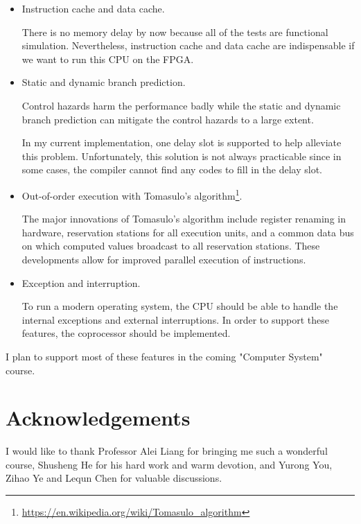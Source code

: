 \documentclass{article}
\begin{document}
\begin{itemize}
\item
Instruction cache and data cache.

There is no memory delay by now because all of the tests are functional simulation. Nevertheless, instruction cache and data cache are indispensable if we want to run this CPU on the FPGA. 
\item
Static and dynamic branch prediction.

Control hazards harm the performance badly while the static and dynamic branch prediction can mitigate the control hazards to a large extent.

In my current implementation, one delay slot is supported to help alleviate this problem. Unfortunately, this solution is not always practicable since in some cases, the compiler cannot find any codes to fill in the delay slot.
\item
Out-of-order execution with Tomasulo's algorithm\footnote{\url{https://en.wikipedia.org/wiki/Tomasulo_algorithm}}.

The major innovations of Tomasulo's algorithm include register renaming in hardware, reservation stations for all execution units, and a common data bus on which computed values broadcast to all reservation stations. These developments allow for improved parallel execution of instructions.
\item
Exception and interruption.

To run a modern operating system, the CPU should be able to handle the internal exceptions and external interruptions. In order to support these features, the coprocessor should be implemented.
\end{itemize}
I plan to support most of these features in the coming "Computer System" course.

\section{Acknowledgements}
I would like to thank Professor Alei Liang for bringing me such a wonderful course, Shusheng He for his hard work and warm devotion, and Yurong You, Zihao Ye and Lequn Chen for valuable discussions.

\newpage
\nocite{patterson2013computer, hennessy2011computer, li2011computer, palnitkar2003verilog, lei2014computer}



\end{document}
